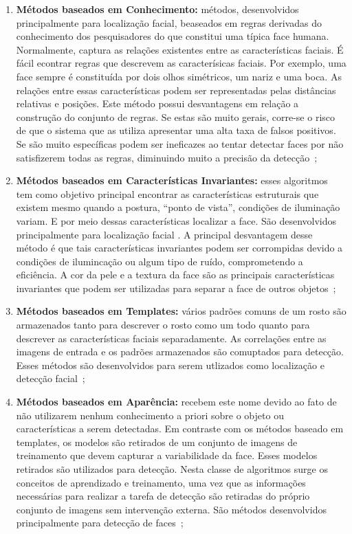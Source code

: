 	\begin{enumerate}
		\item \textbf{Métodos baseados em Conhecimento:} métodos, desenvolvidos principalmente para localização facial, beaseados em regras derivadas do conhecimento dos pesquisadores do que constitui uma típica face humana. Normalmente, captura as relações existentes entre as características faciais. É fácil econtrar regras que descrevem as caracterísicas faciais. Por exemplo, uma face sempre é constituída por dois olhos simétricos, um nariz e uma boca. As relações entre essas características podem ser representadas pelas distâncias relativas e posições. Este método possui desvantagens em relação a construção do conjunto de regras. Se estas são muito gerais, corre-se o risco de que o sistema que as utiliza apresentar uma alta taxa de falsos positivos. Se são muito específicas podem ser ineficazes ao tentar detectar faces por não satisfizerem todas as regras, diminuindo muito a precisão da detecção~\cite{yang,lopes};

		\item \textbf{Métodos baseados em Características Invariantes:} esses algoritmos tem como objetivo principal encontrar as características estruturais que existem mesmo quando a postura, ``ponto de vista'', condições de iluminação variam. E por meio dessas características localizar a face. São desenvolvidos principalmente para localização facial \cite{yang}. A principal desvantagem desse método é que tais características invariantes podem ser corrompidas devido a condições de ilumincação ou algum tipo de ruído, comprometendo a eficiência. A cor da pele e a textura da face são as principais características invariantes que podem ser utilizadas para separar a face de outros objetos~\cite{lopes};

		\item \textbf{Métodos baseados em Templates:} vários padrões comuns de um rosto são armazenados tanto para descrever o rosto como um todo quanto para descrever as características faciais separadamente. As correlações entre as imagens de entrada e os padrões armazenados são comuptados para detecção. Esses métodos são desenvolvidos para serem utlizados como localização e detecção facial~\cite{yang};

		\item \textbf{Métodos baseados em Aparência:} recebem este nome devido ao fato de não utilizarem nenhum conhecimento a priori sobre o objeto ou características a serem detectadas. Em contraste com os métodos baseado em templates, os modelos são retirados de um conjunto de imagens de treinamento que devem capturar a variabilidade da face. Esses modelos retirados são utilizados para detecção. Nesta classe de algoritmos surge os conceitos de aprendizado e treinamento, uma vez que as informações necessárias para realizar a tarefa de detecção são retiradas do próprio conjunto de imagens sem intervenção externa. São métodos desenvolvidos principalmente para detecção de faces~\cite{yang, lopes};

	\end{enumerate}

